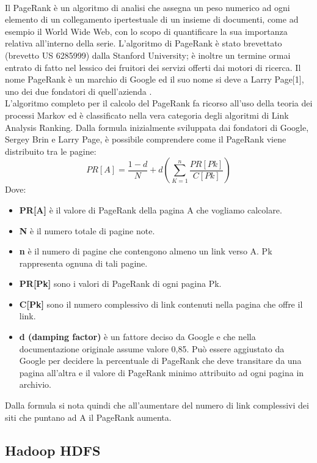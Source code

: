\\Il PageRank è un algoritmo di analisi che assegna un peso numerico ad ogni elemento di un collegamento ipertestuale di un insieme di documenti, come ad esempio il World Wide Web, con lo scopo di quantificare la sua importanza relativa all'interno della serie. L'algoritmo di PageRank è stato brevettato (brevetto US 6285999) dalla Stanford University; è inoltre un termine ormai entrato di fatto nel lessico dei fruitori dei servizi offerti dai motori di ricerca. Il nome PageRank è un marchio di Google ed il suo nome si deve a Larry Page[1], uno dei due fondatori di quell'azienda \cite{wiki:pageRank}.
\\L'algoritmo completo per il calcolo del PageRank fa ricorso all'uso della teoria dei processi Markov ed è classificato nella vera categoria degli algoritmi di Link Analysis Ranking. Dalla formula inizialmente sviluppata dai fondatori di Google, Sergey Brin e Larry Page, è possibile comprendere come il PageRank viene distribuito tra le pagine:
$$
PR[A] = \frac{1-d}{N} + d (\sum_{K=1}^n \frac{PR[Pk]}{C[Pk]})
$$
Dove:
\begin{itemize}
\item \textbf{PR[A]} è il valore di PageRank della pagina A che vogliamo calcolare.
\item \textbf{N} è il numero totale di pagine note.
\item \textbf{n} è il numero di pagine che contengono almeno un link verso A. Pk rappresenta ognuna di tali pagine.
\item \textbf{PR[Pk]} sono i valori di PageRank di ogni pagina Pk.
\item \textbf{C[Pk]} sono il numero complessivo di link contenuti nella pagina che offre il link.
\item \textbf{d (damping factor)} è un fattore deciso da Google e che nella documentazione originale assume valore 0,85. Può essere aggiustato da Google per decidere la percentuale di PageRank che deve transitare da una pagina all'altra e il valore di PageRank minimo attribuito ad ogni pagina in archivio.
\end{itemize}
Dalla formula si nota quindi che all'aumentare del numero di link complessivi dei siti che puntano ad A il PageRank aumenta.

\subsection{Hadoop HDFS}
\label{sec:hadoop HDFS}

